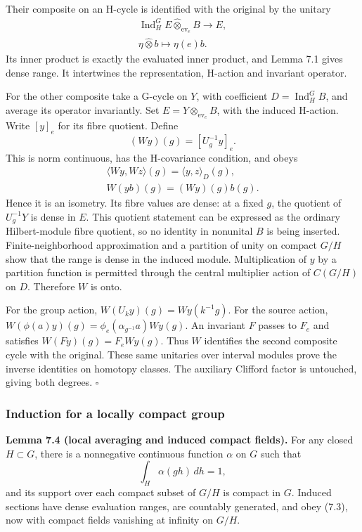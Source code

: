 \documentclass[
  11pt,
]{article}
\begin{document}
Their composite on an H-cycle is identified with the original by the
unitary \[
\begin{gathered}
\operatorname{Ind}_H^G E
 \widehat\otimes_{\operatorname{ev}_e}B
 \longrightarrow E,\\
\eta\widehat\otimes b\longmapsto\eta(e)b.
\end{gathered}
\tag{7.9}
\] Its inner product is exactly the evaluated inner product, and Lemma
7.1 gives dense range. It intertwines the representation, H-action and
invariant operator.

For the other composite take a G-cycle on \(Y\), with coefficient
\(D=\operatorname{Ind}_H^G B\), and average its operator invariantly.
Set \(E=Y\widehat\otimes_{\operatorname{ev}_e}B\), with the induced
H-action. Write \([y]_e\) for its fibre quotient. Define \[
(Wy)(g)=[U_g^{-1}y]_e.
\tag{7.10}
\] This is norm continuous, has the H-covariance condition, and obeys \[
\begin{gathered}
\langle Wy,Wz\rangle(g)
 =\langle y,z\rangle_D(g),\\
W(yb)(g)=(Wy)(g)b(g).
\end{gathered}
\tag{7.11}
\] Hence it is an isometry. Its fibre values are dense: at a fixed
\(g\), the quotient of \(U_g^{-1}Y\) is dense in \(E\). This quotient
statement can be expressed as the ordinary Hilbert-module fibre
quotient, so no identity in nonunital \(B\) is being inserted.
Finite-neighborhood approximation and a partition of unity on compact
\(G/H\) show that the range is dense in the induced module.
Multiplication of \(y\) by a partition function is permitted through the
central multiplier action of \(C(G/H)\) on \(D\). Therefore \(W\) is
onto.

For the group action, \(W(U_k y)(g)=Wy(k^{-1}g)\). For the source
action, \(W(\phi(a)y)(g)=\phi_e(\alpha_{g^{-1}}a)Wy(g)\). An invariant
\(F\) passes to \(F_e\) and satisfies \(W(Fy)(g)=F_e Wy(g)\). Thus \(W\)
identifies the second composite cycle with the original. These same
unitaries over interval modules prove the inverse identities on homotopy
classes. The auxiliary Clifford factor is untouched, giving both
degrees. \(\square\)

\subsubsection{Induction for a locally compact
group}\label{induction-for-a-locally-compact-group}

\textbf{Lemma 7.4 (local averaging and induced compact fields).} For any
closed \(H\subset G\), there is a nonnegative continuous function
\(\alpha\) on \(G\) such that \[
\int_H\alpha(gh)\,dh=1,
\tag{7.12}
\] and its support over each compact subset of \(G/H\) is compact in
\(G\). Induced sections have dense evaluation ranges, are countably
generated, and obey (7.3), now with compact fields vanishing at infinity
on \(G/H\).
\end{document}

